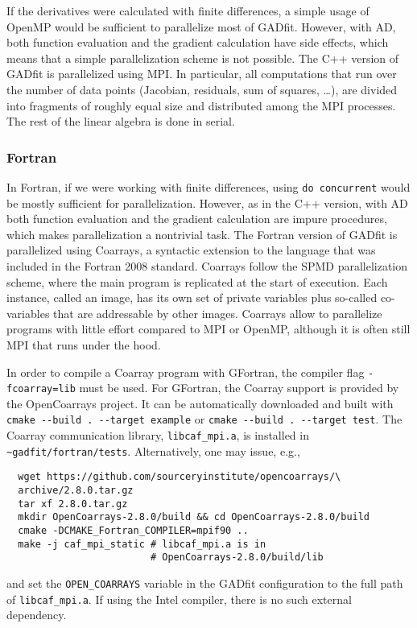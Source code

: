\documentclass{article}
\begin{document}
If the derivatives were calculated with finite differences, a simple usage of OpenMP would be sufficient to parallelize most of GADfit. However, with AD, both function evaluation and the gradient calculation have side effects, which means that a simple parallelization scheme is not possible. The C++ version of GADfit is parallelized using MPI. In particular, all computations that run over the number of data points (Jacobian, residuals, sum of squares, \ldots), are divided into fragments of roughly equal size and distributed among the MPI processes. The rest of the linear algebra is done in serial.

\subsubsection{\label{sec:parallelism_fortran}Fortran}

In Fortran, if we were working with finite differences, using \texttt{do concurrent} would be mostly sufficient for parallelization. However, as in the C++ version, with AD both function evaluation and the gradient calculation are impure procedures, which makes parallelization a nontrivial task. The Fortran version of GADfit is parallelized using Coarrays, a syntactic extension to the language that was included in the Fortran 2008 standard. Coarrays follow the SPMD parallelization scheme, where the main program is replicated at the start of execution. Each instance, called an image, has its own set of private variables plus so-called co-variables that are addressable by other images. Coarrays allow to parallelize programs with little effort compared to MPI or OpenMP, although it is often still MPI that runs under the hood.

In order to compile a Coarray program with GFortran, the compiler flag \texttt{-fcoarray=lib} must be used. For GFortran, the Coarray support is provided by the OpenCoarrays project. It can be automatically downloaded and built with \verb+cmake --build . --target example+ or \verb+cmake --build . --target test+. The Coarray communication library, \verb+libcaf_mpi.a+, is installed in \\
\verb+~gadfit/fortran/tests+. Alternatively, one may issue, e.g.,
\begin{verbatim}
  wget https://github.com/sourceryinstitute/opencoarrays/\
  archive/2.8.0.tar.gz
  tar xf 2.8.0.tar.gz
  mkdir OpenCoarrays-2.8.0/build && cd OpenCoarrays-2.8.0/build
  cmake -DCMAKE_Fortran_COMPILER=mpif90 ..
  make -j caf_mpi_static # libcaf_mpi.a is in
                         # OpenCoarrays-2.8.0/build/lib
\end{verbatim}
and set the \verb+OPEN_COARRAYS+ variable in the GADfit configuration to the full path of \verb+libcaf_mpi.a+. If using the Intel compiler, there is no such external dependency.
\end{document}
